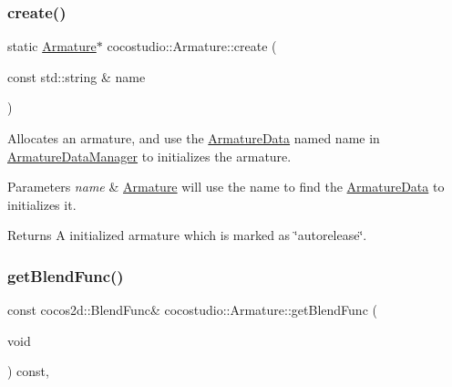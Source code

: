\subsubsection{\texorpdfstring{create()}{create()}\hspace{0.1cm}{\footnotesize\ttfamily [4/4]}}
{\footnotesize\ttfamily static \hyperlink{classcocostudio_1_1Armature}{Armature}$\ast$ cocostudio\+::\+Armature\+::create (\begin{DoxyParamCaption}\item[{const std\+::string \&}]{name }\end{DoxyParamCaption})\hspace{0.3cm}{\ttfamily [static]}}

Allocates an armature, and use the \hyperlink{classcocostudio_1_1ArmatureData}{Armature\+Data} named name in \hyperlink{classcocostudio_1_1ArmatureDataManager}{Armature\+Data\+Manager} to initializes the armature.


\begin{DoxyParams}{Parameters}
{\em name} & \hyperlink{classcocostudio_1_1Armature}{Armature} will use the name to find the \hyperlink{classcocostudio_1_1ArmatureData}{Armature\+Data} to initializes it. \\
\hline
\end{DoxyParams}
\begin{DoxyReturn}{Returns}
A initialized armature which is marked as \char`\"{}autorelease\char`\"{}. 
\end{DoxyReturn}
\mbox{\label{classcocostudio_1_1Armature_acd462bbd0dc9fec97bb2778a2ad13bfc}} 
\subsubsection{\texorpdfstring{get\+Blend\+Func()}{getBlendFunc()}\hspace{0.1cm}{\footnotesize\ttfamily [1/2]}}
{\footnotesize\ttfamily const cocos2d\+::\+Blend\+Func\& cocostudio\+::\+Armature\+::get\+Blend\+Func (\begin{DoxyParamCaption}\item[{void}]{ }\end{DoxyParamCaption}) const\hspace{0.3cm}{\ttfamily [inline]}, {\ttfamily [override]}}

